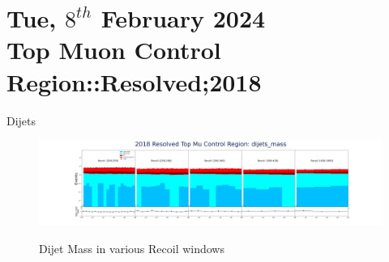 \documentclass[10pt,xcolor=dvipsnames,aspectratio=169]{beamer}
\begin{document}



\section[Top Muon Control Region:Resolved;2018]{Tue, $8^{th}$ February 2024 \\ Top Muon Control Region::Resolved;2018}


     \begin{frame}[fragile]{Dijets}
      \centering
        \begin{figure}
          \centering
          \includegraphics[width=1\textwidth]{../Debug/topCR/plots/debug/CR_resolved_TopMu_dijets_mass.png}
          \label{TopMuCR:Dijet_mass}
          \caption{Dijet Mass in various Recoil windows}
        \end{figure}
    \end{frame}

\end{document}
